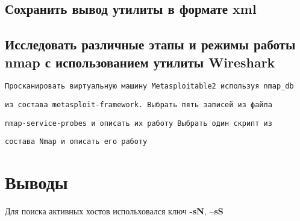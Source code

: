 \documentclass[12pt,a4paper]{article}
\begin{document}
\subsection{Сохранить вывод утилиты в формате xml}
\subsection{Исследовать различные этапы и режимы работы nmap с использованием утилиты Wireshark}
\verb+Просканировать виртуальную машину Metasploitable2 используя nmap_db +

\verb+из состава metasploit-framework. Выбрать пять записей из файла+ 

\verb+nmap-service-probes и описать их работу Выбрать один скрипт из +

\verb+состава Nmap и описать его работу+
\section{Выводы}
Для поиска активных хостов испольховался ключ \textbf{-sN}, \textbf{--sS}
\end{document}
